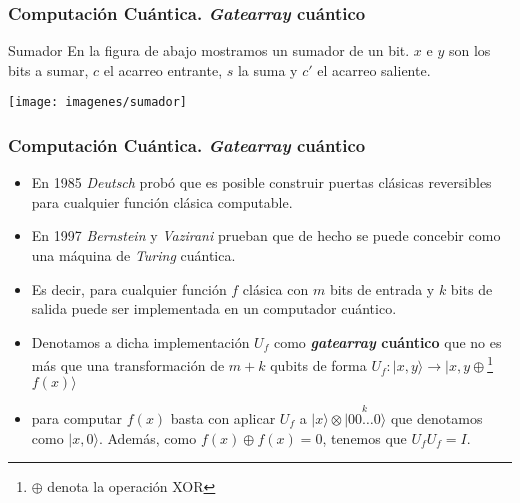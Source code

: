 \documentclass{beamer}
\newcommand{\base}[1]{|#1\rangle}
\begin{document}
\begin{frame}
	\frametitle{Computación Cuántica. \textit{Gatearray} cuántico}
	\begin{block}{Sumador}
	En la figura de abajo mostramos un sumador de un bit. $x$ e $y$ son los bits a sumar, $c$ el acarreo entrante, $s$ la suma y $c'$ el acarreo saliente.
	\end{block}
	\begin{center}
	\texttt{[image: imagenes/sumador]}
	\end{center}
\end{frame}

\begin{frame}
	\frametitle{Computación Cuántica. \textit{Gatearray} cuántico}
	\begin{itemize}
	\item En 1985 \textit{Deutsch} probó que es posible construir puertas clásicas reversibles para cualquier función clásica computable.
	\item En 1997 \textit{Bernstein} y \textit{Vazirani} prueban que de hecho se puede concebir como una máquina de \textit{Turing} cuántica.
	\item Es decir, para cualquier función $f$ clásica con $m$ bits de entrada y $k$ bits de salida puede ser implementada en un computador cuántico.
	\item Denotamos a dicha implementación $U_f$ como \textbf{\textit{gatearray} cuántico} que no es más que una transformación de $m+k$ qubits de forma $U_f:\base{x,y}\to\base{x,y\oplus$\footnote{$\oplus$ denota la operación XOR}$f(x)}$
	\item para computar $f(x)$ basta con aplicar $U_f$ a $\base{x}\otimes\base{\overset{k}{00\hdots0}}$ que denotamos como $\base{x,0}$. Además, como $f(x)\oplus f(x) = 0$, tenemos que $U_fU_f=I$.
	\end{itemize}
\end{frame}
\end{document}
